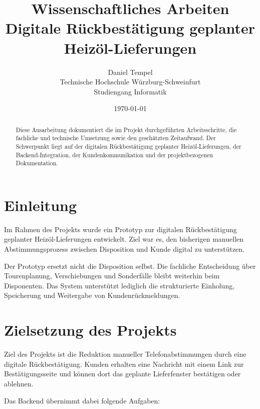 \documentclass[
12pt,
a4paper,
oneside
]{article}
\title{
	\textbf{Wissenschaftliches Arbeiten}\\[0.4cm]
	\large Digitale Rückbestätigung geplanter Heizöl-Lieferungen
}
\author{
	Daniel Tempel\\
	Technische Hochschule Würzburg-Schweinfurt\\
	Studiengang Informatik
}
\date{\today}
\begin{document}
	
	\maketitle
	
	\thispagestyle{empty}
	
	\vspace{1cm}
	
	\begin{abstract}
		Diese Ausarbeitung dokumentiert die im Projekt durchgeführten Arbeitsschritte,
		die fachliche und technische Umsetzung sowie den geschätzten Zeitaufwand.
		Der Schwerpunkt liegt auf der digitalen Rückbestätigung geplanter Heizöl-Lieferungen,
		der Backend-Integration, der Kundenkommunikation und der projektbezogenen Dokumentation.
	\end{abstract}
	
	\newpage
	
	\tableofcontents
	
	\newpage
	
	
	\section{Einleitung}
	
	Im Rahmen des Projekts wurde ein Prototyp zur digitalen Rückbestätigung geplanter
	Heizöl-Lieferungen entwickelt. Ziel war es, den bisherigen manuellen Abstimmungsprozess
	zwischen Disposition und Kunde digital zu unterstützen.
	
	Der Prototyp ersetzt nicht die Disposition selbst. Die fachliche Entscheidung über
	Tourenplanung, Verschiebungen und Sonderfälle bleibt weiterhin beim Disponenten.
	Das System unterstützt lediglich die strukturierte Einholung, Speicherung und
	Weitergabe von Kundenrückmeldungen.
	
	\section{Zielsetzung des Projekts}
	
	Ziel des Projekts ist die Reduktion manueller Telefonabstimmungen durch eine digitale
	Rückbestätigung. Kunden erhalten eine Nachricht mit einem Link zur Bestätigungsseite
	und können dort das geplante Lieferfenster bestätigen oder ablehnen.
	
	Das Backend übernimmt dabei folgende Aufgaben:
	
\end{document}
